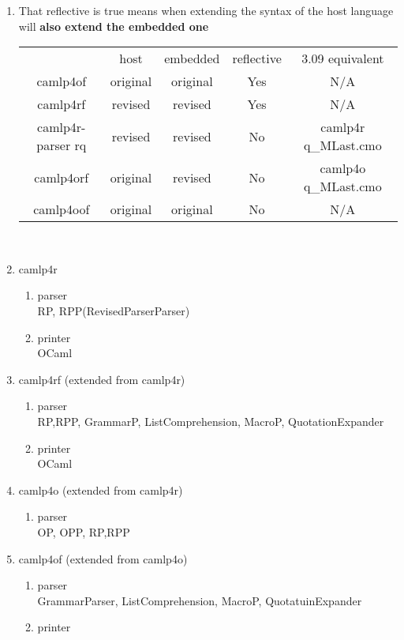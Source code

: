 \begin{enumerate}
\item That reflective is true means when extending the syntax of the host language
  will {\bf also extend the embedded one} \\
  
  \begin{tabular}{|c|c|c|c|c|}
    \hline
                      & host     & embedded & reflective & 3.09 equivalent     \\
    camlp4of          & original & original & Yes        & N/A                 \\
    camlp4rf          & revised  & revised  & Yes        & N/A                 \\
    camlp4r-parser rq & revised  & revised  & No         & camlp4r q\_MLast.cmo \\
    camlp4orf         & original & revised  & No         & camlp4o q\_MLast.cmo \\
    camlp4oof         & original & original & No         & N/A                 \\
    \hline
  \end{tabular} \\
  
  \item camlp4r
    \begin{enumerate}
    \item parser \\
      RP, RPP(RevisedParserParser)
    \item printer \\
      OCaml
    \end{enumerate}
  \item camlp4rf (extended from camlp4r)
    \begin{enumerate}
    \item parser \\
      RP,RPP, GrammarP, ListComprehension, MacroP, QuotationExpander
    \item printer \\
      OCaml
    \end{enumerate}
  \item camlp4o (extended from camlp4r)
    \begin{enumerate}
    \item parser \\
      OP, OPP, RP,RPP
    \end{enumerate}

  \item camlp4of (extended from camlp4o)
    \begin{enumerate}
    \item parser \\
      GrammarParser, ListComprehension, MacroP, QuotatuinExpander
    \item printer 
    \end{enumerate}



\end{enumerate}
